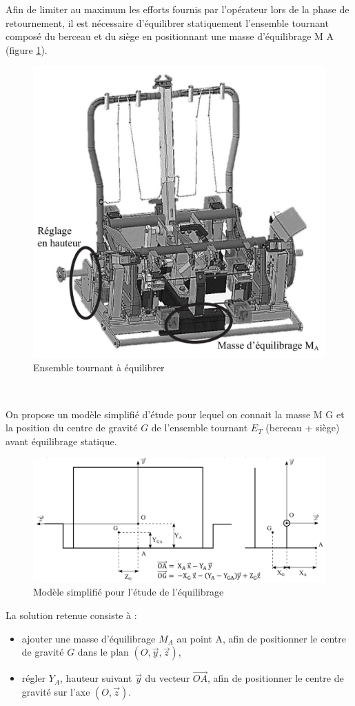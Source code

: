 Afin de limiter au maximum les efforts fournis par l’opérateur lors de la phase de retournement, il est nécessaire d’équilibrer statiquement l’ensemble tournant composé du berceau et du siège en positionnant une masse d’équilibrage M A (figure \ref{img09}).

\begin{figure}[!h]
\centering\includegraphics[width=0.45\linewidth]{img/fig09}
 \caption{Ensemble tournant à équilibrer}
 \label{img09}
\end{figure}


~\

On propose un modèle simplifié d’étude pour lequel on connait la masse M G et la position du centre de gravité $G$ de l’ensemble tournant $E_T$ (berceau + siège) avant équilibrage statique.

\begin{figure}[!h]
\centering\includegraphics[width=0.8\linewidth]{img/fig10}
 \caption{Modèle simplifié pour l’étude de l’équilibrage}
 \label{img10}
\end{figure}

La solution retenue consiste à :
\begin{itemize}
 \item ajouter une masse d’équilibrage $M_A$ au point A, afin de positionner le centre de gravité $G$ dans le plan $(O,\vec{y},\vec{z})$,
 \item régler $Y_A$, hauteur suivant $\vec{y}$ du vecteur $\overrightarrow{OA}$, afin de positionner le centre de gravité sur l’axe
$(O, \vec{z})$.
\end{itemize}

